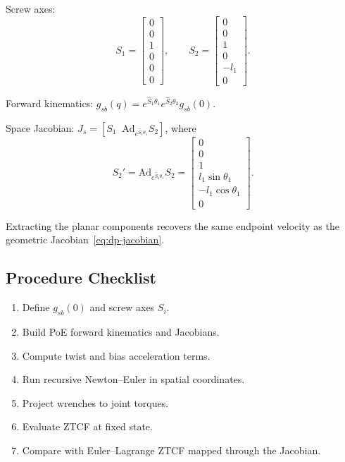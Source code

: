 \documentclass[11pt]{article}
\begin{document}
Screw axes:
\begin{equation}\label{eq:dp-screws}
S_1 = \begin{bmatrix}0\\0\\1\\0\\0\\0\end{bmatrix}, \qquad
S_2 = \begin{bmatrix}0\\0\\1\\0\\-l_1\\0\end{bmatrix}.
\end{equation}

Forward kinematics: $g_{sb}(q)=e^{\hat{S}_1\theta_1}e^{\hat{S}_2\theta_2}g_{sb}(0)$.

Space Jacobian: $J_s = [S_1 \;\; \mathrm{Ad}_{e^{\hat{S}_1\theta_1}}S_2]$, where
\begin{equation}
S_2' = \mathrm{Ad}_{e^{\hat{S}_1\theta_1}}S_2 = \begin{bmatrix}0\\0\\1\\l_1\sin\theta_1\\-l_1\cos\theta_1\\0\end{bmatrix}.
\end{equation}

Extracting the planar components recovers the same endpoint velocity as the geometric Jacobian~\eqref{eq:dp-jacobian}.

\subsection{Procedure Checklist}

\begin{enumerate}
\item Define $g_{sb}(0)$ and screw axes $S_i$.
\item Build PoE forward kinematics and Jacobians.
\item Compute twist and bias acceleration terms.
\item Run recursive Newton--Euler in spatial coordinates.
\item Project wrenches to joint torques.
\item Evaluate ZTCF at fixed state.
\item Compare with Euler--Lagrange ZTCF mapped through the Jacobian.
\end{enumerate}
\end{document}
